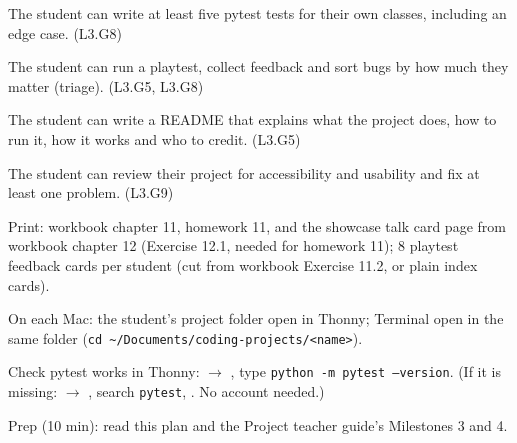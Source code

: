 
\begin{objectives}
  \item The student can write at least five pytest tests for their own classes, including an edge case. (L3.G8)
  \item The student can run a playtest, collect feedback and sort bugs by how much they matter (triage). (L3.G5, L3.G8)
  \item The student can write a README that explains what the project does, how to run it, how it works and who to credit. (L3.G5)
  \item The student can review their project for accessibility and usability and fix at least one problem. (L3.G9)
\end{objectives}

\begin{materials}
  \item Print: workbook chapter 11, homework 11, and the showcase talk card page from workbook chapter 12 (Exercise 12.1, needed for homework 11); 8 playtest feedback cards per student (cut from workbook Exercise 11.2, or plain index cards).
  \item On each Mac: the student's project folder open in Thonny; Terminal open in the same folder (\texttt{cd \textasciitilde/Documents/coding-projects/<name>}).
  \item Check pytest works in Thonny:  $\rightarrow$ , type \texttt{python -m pytest --version}. (If it is missing:  $\rightarrow$ , search \texttt{pytest}, . No account needed.)
  \item Prep (10 min): read this plan and the Project teacher guide's Milestones 3 and 4.
\end{materials}

\begin{timeplan}
\end{timeplan}

